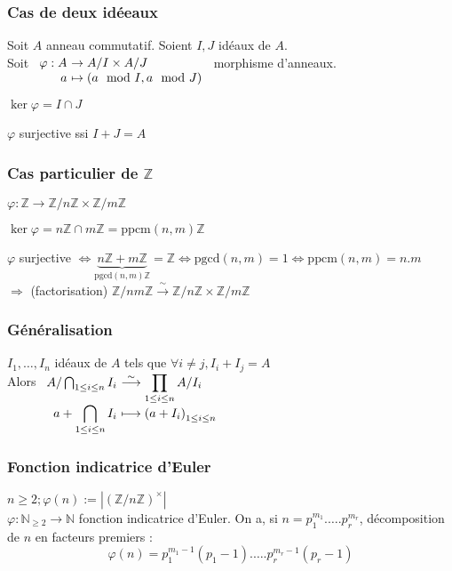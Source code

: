 \documentclass[reqno,a4paper,10pt]{report}
\makeatletter
\newcommand{\underb}[2]{\underset{#1}{\underbrace{#2}}}
\newcommand{\IZ}{\ensuremath{\mathbb{Z}}\xspace} %
\newcommand{\IN}{\ensuremath{\mathbb{N}}\xspace} %
\newcommand{\soo}{\Longrightarrow}
\newcommand{\bij}{\overset{\!\sim}{\to}} %
\newcommand{\pgcd}{\mathrm{pgcd}} %
\newcommand{\ppcm}{\mathrm{ppcm}}
\let\oldenumerate=\enumerate%
\renewenvironment{enumerate}{%
    \oldenumerate%
  }{%
    \@noparlisttrue%
    \endlist%
  }%
\makeatother
\begin{document}
\subsubsection{Cas de deux idéeaux}
Soit $A$ anneau commutatif. Soient $I, J$ idéaux de $A$.\\
Soit $\begin{array}[t]{r@{\ }l}
  \varphi : A &\to A/I \times A/J\\
  a &\mapsto (a \mod I, a \mod J)
\end{array}$ morphisme d'anneaux.
\begin{enumerate}[(i)]
  \item $\ker \varphi = I \cap J$
  \item $\varphi$ surjective ssi $I+J=A$
\end{enumerate}
\begin{comment}
  Preuve 29/10/08 p1
\end{comment}

\subsubsection{Cas particulier de $\IZ$}
$\varphi: \IZ \to \IZ/n\IZ \times \IZ/m\IZ$
\begin{enumerate}[1)]
  \item $\ker \varphi = n\IZ \cap m\IZ = \ppcm(n,m)\IZ$
  \item $\varphi$ surjective $\iff\underb{\pgcd(n,m)\IZ}{n\IZ+m\IZ}=\IZ \iff
    \pgcd(n,m)=1 \iff \ppcm(n,m)=n.m$\\
    $\soo$ (factorisation) $\IZ/nm\IZ \bij \IZ/n\IZ \times \IZ/m\IZ$
\end{enumerate}


\subsubsection{Généralisation}
$I_1, \dots, I_n$ idéaux de $A$ tels que $\forall i \neq j, I_i + I_j = A$\\
Alors $
\begin{array}[t]{r@{\ }l}
  A/\bigcap_{1\leq i \leq n} I_i &\displaystyle
  \overset{\sim}{\longrightarrow} \prod_{1 \leq i\leq n} A/I_i\\
  \displaystyle a+\bigcap_{1\leq i \leq n} I_i &\displaystyle \longmapsto
  \left( a+I_i \right)_{1\leq i \leq n}
\end{array}
$

\subsubsection{Fonction indicatrice d'Euler}
$n\geq 2; \varphi(n):=|(\IZ/n\IZ)^\times|$\\
$\varphi:\IN_{\geq 2} \longrightarrow \IN$ fonction indicatrice d'Euler.
On a, si $n=p_1^{m_1}. \dots . p_r^{m_r}$, décomposition de $n$ en facteurs
premiers :
\[\varphi(n)=p_1^{m_1-1}(p_1 - 1). \dots . p_r^{m_r-1}(p_r-1)\]
\begin{comment}
  Preuve Application du thm chinois généralisé, 29/10/08 p2
\end{comment}
\end{document}
